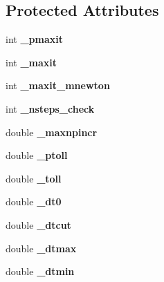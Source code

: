 \subsection*{Protected Attributes}
\begin{DoxyCompactItemize}
\item 
\hypertarget{classAlgor_ad740277800958998dd6008f00f32925f}{int {\bfseries \-\_\-pmaxit}}\label{classAlgor_ad740277800958998dd6008f00f32925f}

\item 
\hypertarget{classAlgor_a7228e31eaf8ed25b8d59fe63a08a3c53}{int {\bfseries \-\_\-maxit}}\label{classAlgor_a7228e31eaf8ed25b8d59fe63a08a3c53}

\item 
\hypertarget{classAlgor_ab86f23a37021a14f41bd5fa9e5594bec}{int {\bfseries \-\_\-maxit\-\_\-mnewton}}\label{classAlgor_ab86f23a37021a14f41bd5fa9e5594bec}

\item 
\hypertarget{classAlgor_a8a61ed1bfbc123cd63540e06dbb081a5}{int {\bfseries \-\_\-nsteps\-\_\-check}}\label{classAlgor_a8a61ed1bfbc123cd63540e06dbb081a5}

\item 
\hypertarget{classAlgor_a873e71ab7393450bb063bbf6d7e1dc68}{double {\bfseries \-\_\-maxnpincr}}\label{classAlgor_a873e71ab7393450bb063bbf6d7e1dc68}

\item 
\hypertarget{classAlgor_a0e41ad8a2b126ec9134b023a86a66d67}{double {\bfseries \-\_\-ptoll}}\label{classAlgor_a0e41ad8a2b126ec9134b023a86a66d67}

\item 
\hypertarget{classAlgor_a46a62a7b265605dba4ac32be0ff0825e}{double {\bfseries \-\_\-toll}}\label{classAlgor_a46a62a7b265605dba4ac32be0ff0825e}

\item 
\hypertarget{classAlgor_a721cecfbb05cde08343708010a7461d8}{double {\bfseries \-\_\-dt0}}\label{classAlgor_a721cecfbb05cde08343708010a7461d8}

\item 
\hypertarget{classAlgor_a0173578993eb72f4d01860a12f3d209d}{double {\bfseries \-\_\-dtcut}}\label{classAlgor_a0173578993eb72f4d01860a12f3d209d}

\item 
\hypertarget{classAlgor_ac88e4e067b75ad8b61855652560750c3}{double {\bfseries \-\_\-dtmax}}\label{classAlgor_ac88e4e067b75ad8b61855652560750c3}

\item 
\hypertarget{classAlgor_a5edeb07ba4925e2616ed453cb1da939d}{double {\bfseries \-\_\-dtmin}}\label{classAlgor_a5edeb07ba4925e2616ed453cb1da939d}


\end{DoxyCompactItemize}
